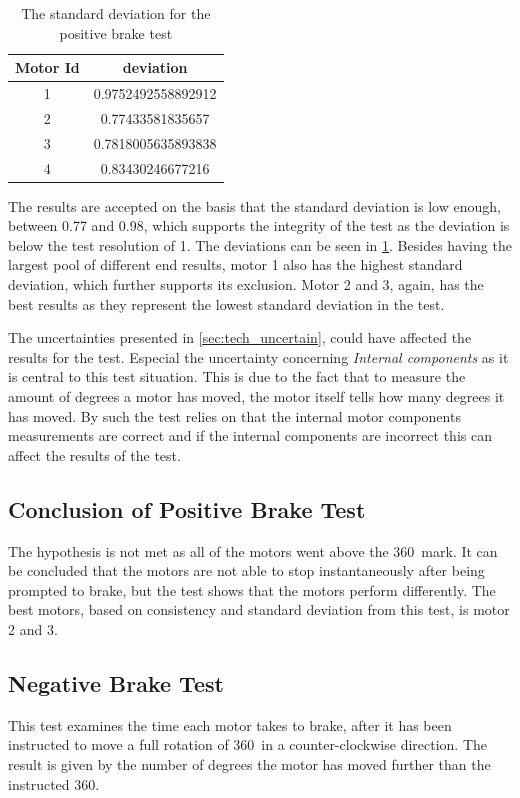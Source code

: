 \begin{table}
  \centering
  \begin{tabular}{| c | c | }
    \hline
    Motor Id & deviation   \\ \hline
    1 & 0.9752492558892912 \\ \hline
    2 & 0.77433581835657   \\ \hline
    3 & 0.7818005635893838 \\ \hline
    4 & 0.83430246677216   \\ \hline
  \end{tabular}
  \caption{The standard deviation for the positive brake test}
  \label{tbl:test_deviation_brake_positive}
\end{table}   

The results are accepted on the basis that the standard deviation is low enough, between 0.77 and 0.98, which supports the integrity of the test as the deviation is below the test resolution of 1\degree . The deviations can be seen in \cref{tbl:test_deviation_brake_positive}. Besides having the largest pool of different end results, motor 1 also has the highest standard deviation, which further supports its exclusion. Motor 2 and 3, again, has the best results as they represent the lowest standard deviation in the test. 

The uncertainties presented in \cref{sec:tech_uncertain}, could have affected the results for the test. Especial the uncertainty concerning \emph{Internal components} as it is central to this test situation. This is due to the fact that to measure the amount of degrees a motor has moved, the motor itself tells how many degrees it has moved. By such the test relies on that the internal motor components measurements are correct and if the internal components are incorrect this can affect the results of the test. 

\subsection{Conclusion of Positive Brake Test}
The hypothesis is not met as all of the motors went above the 360\degree\ mark. It can be concluded that the motors are not able to stop instantaneously after being prompted to brake, but the test shows that the motors perform differently. The best motors, based on consistency and standard deviation from this test, is motor 2 and 3.

\subsection{Negative Brake Test}\label{sec:braketest_neg}
This test examines the time each motor takes to brake, after it has been instructed to move a full rotation of 360\degree\ in a counter-clockwise direction. The result is given by the number of degrees the motor has moved further than the instructed 360\degree .

